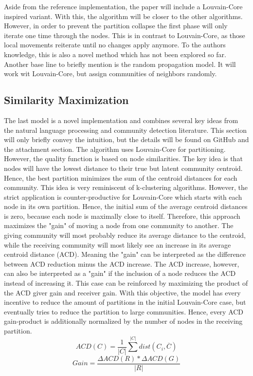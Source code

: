 \documentclass[11pt, twocolumn]{article}
\begin{document}
Aside from the reference implementation, the paper will include a Louvain-Core inspired variant. With this, the algorithm will be closer to the other algorithms. However, in order to prevent the partition collapse the first phase will only iterate one time through the nodes. This is in contrast to Louvain-Core, as those local movements reiterate until no changes apply anymore. To the authors knowledge, this is also a novel method which has not been explored so far. Another base line to briefly mention is the random propagation model. It will work wit Louvain-Core, but assign communities of neighbors randomly.

\subsection{Similarity Maximization}
The last model is a novel implementation and combines several key ideas from the natural language processing and community detection literature. This section will only briefly convey the intuition, but the details will be found on GitHub and the attachment section. The algorithm uses Louvain-Core for partitioning. However, the quality function is based on node similarities. The key idea is that nodes will have the lowest distance to their true but latent community centroid. Hence, the best partition minimizes the sum of the centroid distances for each community. This idea is very reminiscent of k-clustering algorithms. However, the strict application is counter-productive for Louvain-Core which starts with each node in its own partition. Hence, the initial sum of the average centroid distances is zero, because each node is maximally close to itself. Therefore, this approach maximizes the "gain" of moving a node from one community to another. The giving community will most probably reduce its average distance to the centroid, while the receiving community will most likely see an increase in its average centroid distance (ACD). Meaning the "gain" can be interpreted as the difference between ACD reduction minus the ACD increase. The ACD increase, however, can also be interpreted as a "gain" if the inclusion of a node reduces the ACD instead of increasing it. This case can be reinforced by maximizing the product of the ACD giver gain and receiver gain. With this objective, the model has every incentive to reduce the amount of partitions in the initial Louvain-Core case, but eventually tries to reduce the partition to large communities. Hence, every ACD gain-product is additionally normalized by the number of nodes in the receiving partition.
\begin{equation}
    ACD(C)= \frac{1}{|C|} \sum^{|C|}dist(C_i, \overline{C})
\end{equation}
\begin{equation}
    Gain = \frac{\Delta ACD(R)*\Delta ACD(G)}{|R|}
\end{equation}
\end{document}
